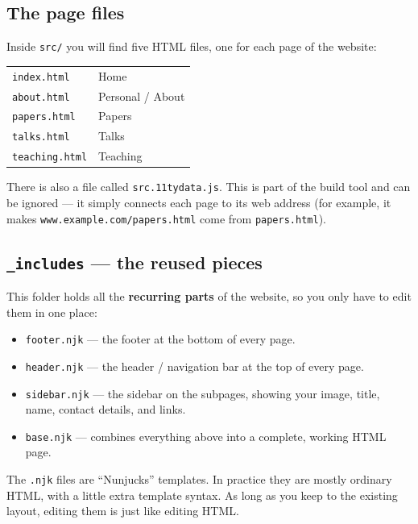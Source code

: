 \documentclass[11pt,a4paper]{article}
\newcommand{\file}[1]{\texttt{#1}}
\begin{document}
\subsection{The page files}

Inside \file{src/} you will find five HTML files, one for each page of the
website:

\begin{center}
\begin{tabular}{@{}ll@{}}
\file{index.html}    & Home \\
\file{about.html}    & Personal / About \\
\file{papers.html}   & Papers \\
\file{talks.html}    & Talks \\
\file{teaching.html} & Teaching \\
\end{tabular}
\end{center}

\noindent There is also a file called \file{src.11tydata.js}. This is part
of the build tool and can be ignored — it simply connects each page to its
web address (for example, it makes
\texttt{www.example.com/papers.html} come from \file{papers.html}).

\subsection{\file{\_includes} — the reused pieces}

This folder holds all the \textbf{recurring parts} of the website, so you
only have to edit them in one place:

\begin{itemize}[leftmargin=1.4em]
  \item \file{footer.njk} — the footer at the bottom of every page.
  \item \file{header.njk} — the header / navigation bar at the top of
        every page.
  \item \file{sidebar.njk} — the sidebar on the subpages, showing your
        image, title, name, contact details, and links.
  \item \file{base.njk} — combines everything above into a complete,
        working HTML page.
\end{itemize}

\begin{notebox}
The \file{.njk} files are ``Nunjucks'' templates. In practice they are
mostly ordinary HTML, with a little extra template syntax. As long as you
keep to the existing layout, editing them is just like editing HTML.
\end{notebox}
\end{document}
